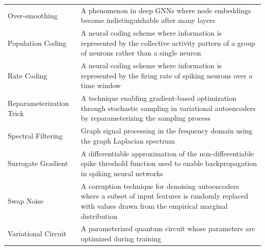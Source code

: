 \begin{table}[H]
\begin{tabularx}{0.85\textwidth}{lL}
Over-smoothing & A phenomenon in deep GNNs where node embeddings become indistinguishable after many layers \\
Population Coding & A neural coding scheme where information is represented by the collective activity pattern of a group of neurons rather than a single neuron \\
Rate Coding & A neural coding scheme where information is represented by the firing rate of spiking neurons over a time window \\
Reparameterization Trick & A technique enabling gradient-based optimization through stochastic sampling in variational autoencoders by reparameterizing the sampling process \\
Spectral Filtering & Graph signal processing in the frequency domain using the graph Laplacian spectrum \\
Surrogate Gradient & A differentiable approximation of the non-differentiable spike threshold function used to enable backpropagation in spiking neural networks \\
Swap Noise & A corruption technique for denoising autoencoders where a subset of input features is randomly replaced with values drawn from the empirical marginal distribution \\
Variational Circuit & A parameterized quantum circuit whose parameters are optimized during training \\
\bottomrule
\end{tabularx}
\end{table}
